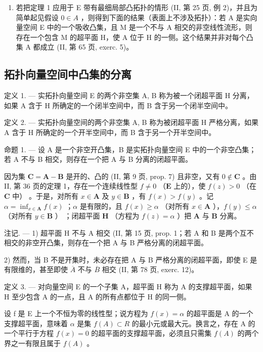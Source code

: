 \begin{enumerate}
\def\labelenumi{\arabic{enumi})}
\setcounter{enumi}{1}
\tightlist
\item
  若把定理 1 应用于 E 带有最细局部凸拓扑的情形 (II, 第 25 页, 例 2)，并且为简单起见假设 \(0 \in A\) ，则得到下面的结果（表面上不涉及拓扑）：若 A 是实向量空间 E 中的一个吸收凸集，且 M 是一个不与 A 相交的非空线性流形，则存在一个包含 M 的超平面 H，使 A 位于 H 的一侧。这个结果并非对每个凸集 A 都成立 (II, 第 65 页, exerc. 5)。
\end{enumerate}

\subsection{拓扑向量空间中凸集的分离}

定义 1. --- 实拓扑向量空间 E 的两个非空集 A, B 称为被一个闭超平面 H 分离，如果 A 含于 H 所确定的一个闭半空间中，而 B 含于另一个闭半空间中。

定义 2. --- 实拓扑向量空间的两个非空集 A, B 称为被闭超平面 H 严格分离，如果 A 含于 H 所确定的一个开半空间中，而 B 含于另一个开半空间中。

命题 1. --- 设 A 是一个非空开凸集，B 是实拓扑向量空间 E 中的一个非空凸集；若 A 不与 B 相交，则存在一个把 A 与 B 分离的闭超平面。

因为集 \(\mathbf{C} = \mathbf{A} - \mathbf{B}\) 是开的、凸的 (II, 第 9 页, prop. 7) 且非空，又有 \(0 \notin \mathbf{C}\) 。由 II, 第 36 页的定理 1，存在一个连续线性型 \(f \neq 0\) （\(\mathbf{E}\) 上的），使 \(f(z) > 0\) （在 \(\mathbf{C}\) 中） 。于是，对所有 \(x \in \mathbf{A}\) 及 \(y \in \mathbf{B}\) ，有 \(f(x) > f(y)\) 。记 \(\alpha = \inf_{x \in \mathbf{A}} f(x)\) ；\(\alpha\) 是有限的，且 \(f(x) \geqslant \alpha\) （对所有 \(x \in \mathbf{A}\) ），\(f(y) \leqslant \alpha\) （对所有 \(y \in \mathbf{B}\) ） ；闭超平面 \(\mathbf{H}\) （方程为 \(f(z) = \alpha\) ）把 \(\mathbf{A}\) 与 \(\mathbf{B}\) 分离。

注记. --- 1) 超平面 H 不与 A 相交 (II, 第 15 页, prop. 1；若 A 和 B 是两个互不相交的非空开凸集，则存在一个把 A 与 B 严格分离的闭超平面。

2) 然而，当 B 不是开集时，未必存在把 A 与 B 严格分离的闭超平面，即使 E 是有限维的，甚至即使 \(\overline{A}\) 不与 \(\overline{B}\) 相交 (II, 第 78 页, exerc. 12)。

定义 3. --- 对向量空间 E 的一个子集 A，超平面 H 称为 A 的支撑超平面，如果 H 至少包含 A 的一点，且 A 的所有点都位于 H 的同一侧。

设 f 是 E 上一个不恒为零的线性型；说方程为 \(f(x) = \alpha\) 的超平面是 A 的一个支撑超平面，意味着 \(\alpha\) 是集 \(f(A) \subset R\) 的最小元或最大元。换言之，存在 A 的一个平行于方程 \(f(x) = 0\) 的超平面的支撑超平面，必须且只需集 \(f(A)\) 的两个界之一有限且属于 \(f(A)\) 。

